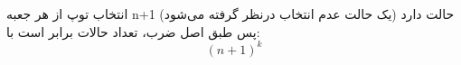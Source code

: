 انتخاب توپ از هر جعبه n+1 حالت دارد 
(یک حالت عدم انتخاب درنظر گرفته می‌شود)
پس طبق اصل ضرب، تعداد حالات برابر است با:
$$(n+1)^k$$   